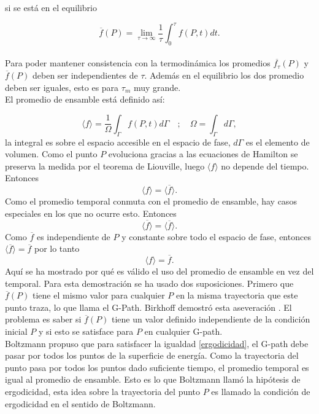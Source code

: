 si se está en el equilibrio

\begin{equation}
\overline{f}(P)= \lim_{\tau \to \infty} \frac{1}{\tau} \int_{0}^{\tau} f(P,t) dt.
\end{equation}
\\
Para poder mantener consistencia con la termodinámica los promedios $\overline{f_{\tau}}(P)$ y  $\overline{f}(P)$ deben ser independientes de $\tau$. Además en el equilibrio los dos promedio deben ser iguales, esto es para $\tau_{m}$ muy grande. \\
El promedio de ensamble está definido así:

\begin{equation}
\langle f \rangle = \frac{1}{\Omega} \int_{\Gamma} f(P,t) d\Gamma \quad ; \quad \Omega= \int_{\Gamma} d\Gamma,
\end{equation}
la integral es sobre el espacio accesible en el espacio de fase, $d\Gamma$ es el elemento de volumen. Como el punto $P$ evoluciona gracias a las ecuaciones de Hamilton se preserva la medida por el teorema de Liouville, luego $\langle f \rangle$ no depende del tiempo. Entonces 
\begin{equation}
\langle f \rangle =  \overline{\langle f \rangle}.
\end{equation}
Como el promedio temporal conmuta con el promedio de ensamble, hay casos especiales en los que no ocurre esto. Entonces
\begin{equation}
\overline{\langle f \rangle} = \langle \overline{f} \rangle.
\end{equation}
Como $\overline{f}$ es independiente de $P$ y constante sobre  todo el espacio de fase, entonces $\langle \overline{f} \rangle= \overline{f}$ por lo tanto
\begin{equation} \label{ergodicidad}
\langle f \rangle = \overline{f}.
\end{equation}
Aquí se ha mostrado por qué es válido el uso del promedio de ensamble en vez del temporal. Para esta demostración se ha usado dos suposiciones. Primero que  $\overline{f}(P)$ tiene el mismo valor para cualquier $P$ en la misma trayectoria que este punto traza, lo que llama \cite{Ehrenfest} el G-Path. Birkhoff demostró esta aseveración \cite{Birkhoff}. El problema es saber si $\overline{f}(P)$  tiene un valor definido independiente de la condición inicial $P$ y si esto se satisface para $P$ en cualquier G-path. \\
Boltzmann propuso que para satisfacer la igualdad \ref{ergodicidad}, el G-path debe pasar por todos los puntos de la superficie de energía. Como la trayectoria del punto pasa por todos los puntos dado suficiente tiempo, el promedio temporal es igual al promedio de ensamble. Esto es lo que Boltzmann llamó la hipótesis de ergodicidad, esta idea sobre la trayectoria del punto $P$ es llamado la condición de ergodicidad en el sentido de Boltzmann.
